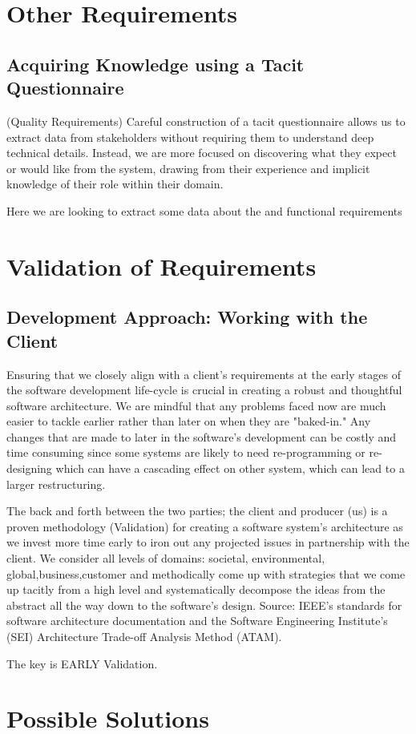 \documentclass{article}
\begin{document}
\section{Other Requirements}
\subsection{Acquiring Knowledge using a Tacit Questionnaire}(Quality Requirements)
Careful construction of a tacit questionnaire allows us to extract data from stakeholders without requiring them to understand deep technical details. Instead, we are more focused on discovering what they expect or would like from the system, drawing from their experience and implicit knowledge of their role within their domain.

Here we are looking to extract some data about the and functional requirements





\section{Validation of Requirements}
\subsection{Development Approach: Working with the Client}
Ensuring that we closely align with a client's requirements at the early stages of the software development life-cycle is crucial in creating a robust and thoughtful software architecture. We are mindful that any problems faced now are much easier to tackle earlier rather than later on when they are "baked-in." Any changes that are made to later in the software's development can be costly and time consuming since some systems are likely to need re-programming or re-designing which can have a cascading effect on other system, which can lead to a larger restructuring. 

The back and forth between the two parties; the client and producer (us) is a proven methodology (Validation) for creating a software system's architecture as we invest more time early to iron out any projected issues in partnership with the client. We consider all levels of domains: societal, environmental, global,business,customer and methodically come up with strategies that we come up tacitly from a high level and systematically decompose the ideas from the abstract all the way down to the software's design. Source: IEEE's standards for software architecture documentation and the Software Engineering Institute's (SEI) Architecture Trade-off Analysis Method (ATAM).

The key is EARLY Validation.


\section{Possible Solutions}
\end{document}
